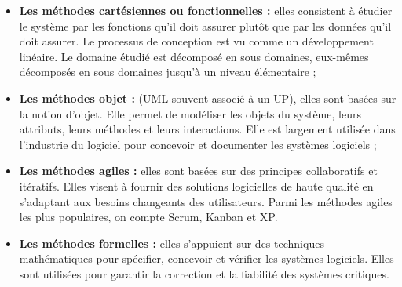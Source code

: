 \begin{itemize}
  \item \textbf{Les méthodes cartésiennes ou fonctionnelles :} elles consistent
    à étudier le système par les fonctions qu'il doit assurer plutôt que par
    les données qu'il doit assurer. Le processus de conception est vu comme un
    développement linéaire.  Le domaine étudié est décomposé en sous domaines,
    eux-mêmes décomposés en sous domaines jusqu'à un niveau élémentaire ;

  \item \textbf{Les méthodes objet :} (\ac{UML} souvent associé à un \ac{UP}), elles
    sont basées sur la notion d’objet. Elle permet de modéliser les objets du
    système, leurs attributs, leurs méthodes et leurs interactions. Elle est
    largement utilisée dans l’industrie du logiciel pour concevoir et documenter
    les systèmes logiciels ;

  \item \textbf {Les méthodes agiles :} elles sont basées sur des principes
    collaboratifs et itératifs. Elles visent à fournir des solutions logicielles
    de haute qualité en s’adaptant aux besoins changeants des utilisateurs.
    Parmi les méthodes agiles les plus populaires, on compte Scrum, Kanban
    et \ac{XP}.

  \item \textbf{Les méthodes formelles :} elles s'appuient sur des techniques
    mathématiques pour spécifier, concevoir et vérifier les systèmes logiciels.
    Elles sont utilisées pour garantir la correction et la fiabilité des systèmes
    critiques.

\end{itemize}


